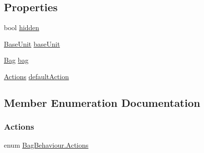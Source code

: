 \subsection*{Properties}
\begin{DoxyCompactItemize}
\item 
bool \mbox{\hyperlink{class_bag_behaviour_a20616261b25fffc37c9b9d68c3994bbe}{hidden}}
\item 
\mbox{\hyperlink{class_base_unit}{Base\+Unit}} \mbox{\hyperlink{class_bag_behaviour_a902e05fcee6312ba24825f3d9f785b8b}{base\+Unit}}
\item 
\mbox{\hyperlink{class_bag}{Bag}} \mbox{\hyperlink{class_bag_behaviour_a2ce7c6b9e26738b42f953a3351b8b1b4}{bag}}
\item 
\mbox{\hyperlink{class_bag_behaviour_aeafbbbda3c9a34d1a73647a8b274788c}{Actions}} \mbox{\hyperlink{class_bag_behaviour_aee692afcced72398af07f9df77990b09}{default\+Action}}
\end{DoxyCompactItemize}


\subsection{Member Enumeration Documentation}
\mbox{\label{class_bag_behaviour_aeafbbbda3c9a34d1a73647a8b274788c}} 
\subsubsection{\texorpdfstring{Actions}{Actions}}
{\footnotesize\ttfamily enum \mbox{\hyperlink{class_bag_behaviour_aeafbbbda3c9a34d1a73647a8b274788c}{Bag\+Behaviour.\+Actions}}\hspace{0.3cm}{\ttfamily [strong]}}

